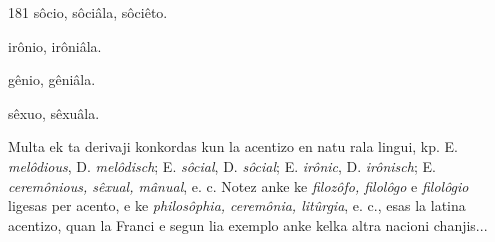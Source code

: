 \begin{VUpage}[185]{181}
sôcio, sôciâla, sôciêto.

irônio, irôniâla.

gênio, gêniâla.

sêxuo, sêxuâla.

Multa ek ta derivaji konkordas kun la acentizo en natu\cc
rala lingui, kp. E. \textit{melôdious}, D. \textit{melôdisch}; E. \textit{sôcial}, D.\nl
\textit{sôcial}; E. \textit{irônic}, D. \textit{irônisch}; E. \textit{ceremônious, sêxual, mânual},\nl
e. c. Notez anke ke \textit{filozôfo, filolôgo} e \textit{filolôgio} ligesas per\nl
acento, e ke \textit{philosôphia, ceremônia, litûrgia}, e. c., esas la\nl
latina acentizo, quan la Franci e segun lia exemplo anke\nl
kelka altra nacioni chanjis...
\end{VUpage}

